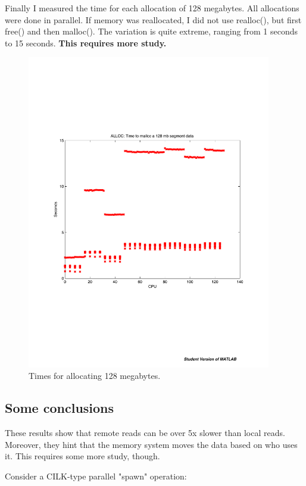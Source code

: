\documentclass[12pt]{article}
\begin{document}
Finally I measured the time for each allocation of 128 megabytes. All allocations were done in parallel. 
If memory was reallocated, I did not use realloc(), but first free() and then malloc(). The variation is quite
extreme, ranging from 1 seconds to 15 seconds. \textbf{This requires more study.}

\begin{figure}[H]
\includegraphics[width=0.95\textwidth]{blacklight_alloc_access.pdf}
\caption{Times for allocating 128 megabytes.
}
\label{figseqran}
\end{figure}


\subsection{Some conclusions}

These results show that remote reads can be over 5x slower than local reads. Moreover, they hint that
the memory system moves the data based on who uses it. This requires some more study, though.

Consider a CILK-type parallel "spawn" operation: 
\end{document}
